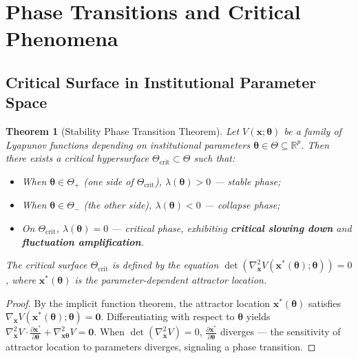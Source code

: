 \documentclass[12pt,a4paper]{article}
\newtheorem{theorem}{Theorem}[section]
\theoremstyle{definition}
\newcommand{\R}{\mathbb{R}}
\newcommand{\lb}{\lambda}
\newcommand{\Lyap}{V}
\newcommand{\grad}{\nabla}
\newcommand{\ppart}[2]{\frac{\partial #1}{\partial #2}}
\begin{document}
\section{Phase Transitions and Critical Phenomena}
\label{sec:phase_transition}

\subsection{Critical Surface in Institutional Parameter Space}
\label{sec:critical_surface}

\begin{theorem}[Stability Phase Transition Theorem]
\label{thm:phase_transition}
Let $\Lyap(\mathbf{x}; \bm{\theta})$ be a family of Lyapunov functions depending on institutional parameters $\bm{\theta} \in \Theta \subseteq \R^p$. Then there exists a critical hypersurface $\Theta_{\text{crit}} \subset \Theta$ such that:
\begin{itemize}
    \item When $\bm{\theta} \in \Theta_{+}$ (one side of $\Theta_{\text{crit}}$), $\lb(\bm{\theta}) > 0$ --- stable phase;
    \item When $\bm{\theta} \in \Theta_{-}$ (the other side), $\lb(\bm{\theta}) < 0$ --- collapse phase;
    \item On $\Theta_{\text{crit}}$, $\lb(\bm{\theta}) = 0$ --- critical phase, exhibiting \textbf{critical slowing down} and \textbf{fluctuation amplification}.
\end{itemize}
The critical surface $\Theta_{\text{crit}}$ is defined by the equation $\det(\nabla^2_{\mathbf{x}} \Lyap(\mathbf{x}^*(\bm{\theta}); \bm{\theta})) = 0$, where $\mathbf{x}^*(\bm{\theta})$ is the parameter-dependent attractor location.
\end{theorem}

\begin{proof}
By the implicit function theorem, the attractor location $\mathbf{x}^*(\bm{\theta})$ satisfies $\grad_{\mathbf{x}} \Lyap(\mathbf{x}^*(\bm{\theta}); \bm{\theta}) = \mathbf{0}$. Differentiating with respect to $\bm{\theta}$ yields $\nabla^2_{\mathbf{x}} \Lyap \cdot \ppart{\mathbf{x}^*}{\bm{\theta}} + \nabla^2_{\mathbf{x}\bm{\theta}} \Lyap = \mathbf{0}$. When $\det(\nabla^2_{\mathbf{x}} \Lyap) = 0$, $\ppart{\mathbf{x}^*}{\bm{\theta}}$ diverges --- the sensitivity of attractor location to parameters diverges, signaling a phase transition.
\end{proof}
\end{document}
